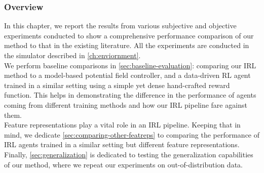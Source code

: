 \label{ch:6}
\subsubsection*{Overview}
In this chapter, we report the results from various subjective and objective experiments conducted to show a comprehensive performance comparison of our method to that in the existing literature. All the experiments are conducted in the simulator described in \autoref{ch:enviornment}. \\
We perform baseline comparisons in \autoref{sec:baseline-evaluation}: comparing our IRL method to a model-based potential field controller, and a data-driven RL agent trained in a similar setting using a simple yet dense hand-crafted reward function. This helps in demonstrating the difference in the performance of agents coming from different training methods and how our IRL pipeline fare against them.\\
 Feature representations play a vital role in an IRL pipeline. Keeping that in mind, we dedicate \autoref{sec:comparing-other-featreps} to comparing the performance of IRL agents trained in a similar setting but different feature representations.\\
 Finally, \autoref{sec:generalization} is dedicated to testing the generalization capabilities of our method, where we repeat our experiments on out-of-distribution data.

%

